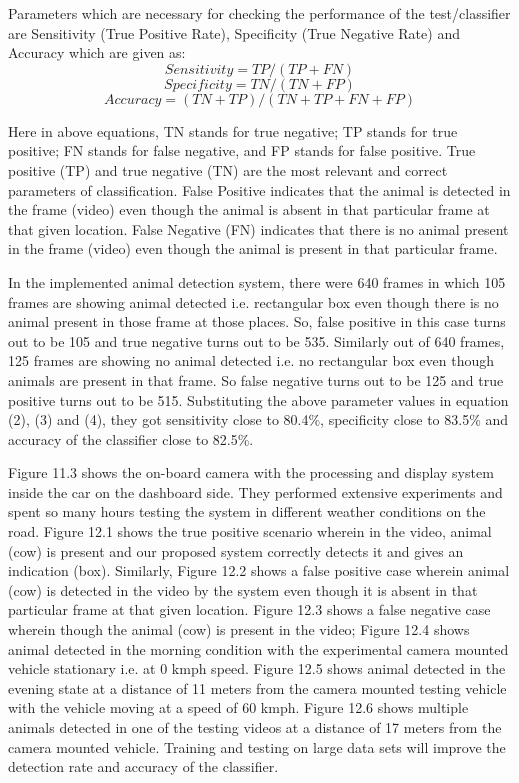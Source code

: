 \documentclass[14pt,a4paper,final]{extreport}
\begin{document}
Parameters which are necessary for checking the performance of the test/classifier are Sensitivity (True Positive Rate), Specificity (True Negative Rate) and Accuracy which are given as:
\newline \textbf {\[Sensitivity=TP/(TP + FN)\] } 
\textbf{\[Specificity=TN/(TN + FP) \]}
\textbf{\[Accuracy=(TN + TP)/(TN + TP + FN + FP)\] }
 \item Here in above equations, TN stands for true negative; TP stands for true positive; FN stands for false negative, and FP stands for false positive. True positive (TP) and true negative (TN) are the most relevant and correct parameters of classification. False Positive indicates that the animal is detected in the frame (video) even though the animal is absent in that particular frame at that given location. False Negative (FN) indicates that there is no animal present in the frame (video) even though the animal is present in that particular frame.

In the implemented animal detection system, there were 640 frames in which 105 frames are showing animal detected i.e. rectangular box even though there is no animal present in those frame at those places. So, false positive in this case turns out to be 105 and true negative turns out to be 535. Similarly out of 640 frames, 125 frames are showing no animal detected i.e. no rectangular box even though animals are present in that frame. So false negative turns out to be 125 and true positive turns out to be 515. Substituting the above parameter values in equation (2), (3) and (4), they got sensitivity close to 80.4\%, specificity close to 83.5\% and accuracy of the classifier close to 82.5\%.

Figure 11.3 shows the on-board camera with the processing and display system inside the car on the dashboard side. They performed extensive experiments and spent so many hours testing the system in different weather conditions on the road. Figure 12.1 shows the true positive scenario wherein in the video, animal (cow) is present and our proposed system correctly detects it and gives an indication (box). Similarly, Figure 12.2  shows a false positive case wherein animal (cow) is detected in the video by the system even though it is absent in that particular frame at that given location. Figure 12.3 shows a false negative case wherein though the animal (cow) is present in the video; Figure 12.4  shows animal detected in the morning condition with the experimental camera mounted vehicle stationary i.e. at 0 kmph speed. Figure 12.5 shows animal detected in the evening state at a distance of 11 meters from the camera mounted testing vehicle with the vehicle moving at a speed of 60 kmph. Figure 12.6 shows multiple animals detected in one of the testing videos at a distance of 17 meters from the camera mounted vehicle. Training and testing on large data sets will improve the detection rate and accuracy of the classifier.
\end{document}

